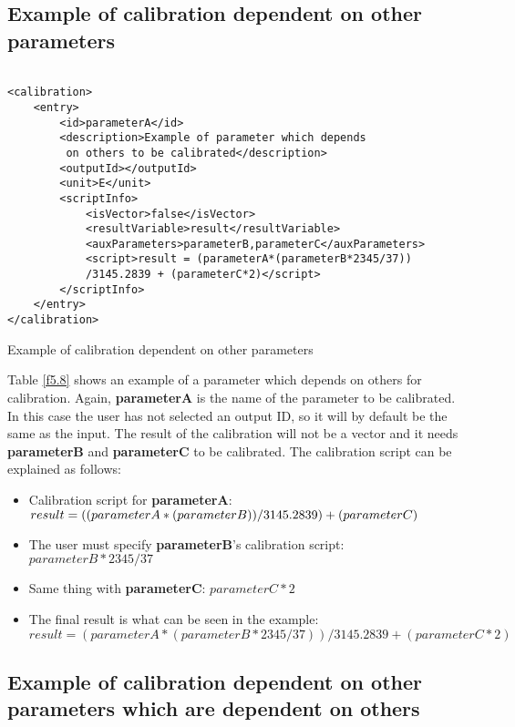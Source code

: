 \subsection{Example of calibration dependent on other parameters}

\begin{table}[H]
\lstset{language=XML}
\begin{lstlisting}

<calibration>
	<entry>
		<id>parameterA</id>
		<description>Example of parameter which depends
		 on others to be calibrated</description>
		<outputId></outputId>
		<unit>E</unit>
		<scriptInfo>
			<isVector>false</isVector>
			<resultVariable>result</resultVariable>
			<auxParameters>parameterB,parameterC</auxParameters>
			<script>result = (parameterA*(parameterB*2345/37))
			/3145.2839 + (parameterC*2)</script>
		</scriptInfo>
	</entry>
</calibration>
\end{lstlisting}
\caption{Example of calibration dependent on other parameters}
\label{Table5.8}
\end{table}

Table \ref{f5.8} shows an example of a parameter which depends on others for calibration. Again, \textbf{parameterA} is the name of the parameter to be calibrated. In this case the user has not selected an output ID, so it will by default be the same as the input. The result of the calibration will not be a vector and it needs \textbf{parameterB} and \textbf{parameterC} to be calibrated. The calibration script can be explained as follows:
\begin{itemize}
\item Calibration script for \textbf{parameterA}: $result = ((parameterA*(parameterB))\\			/3145.2839) + (parameterC)$
\item The user must specify \textbf{parameterB}'s calibration script: $parameterB*2345/37$
\item Same thing with \textbf{parameterC}: $parameterC*2$
\item The final result is what can be seen in the example: $result = (parameterA*(parameterB*2345/37))/3145.2839 + (parameterC*2)$
\end{itemize}
\pagebreak

\subsection{Example of calibration dependent on other parameters which are dependent on others}


